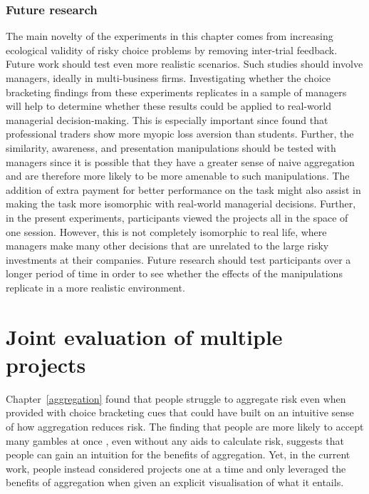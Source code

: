 \documentclass[a4paper, nobind, dvipsnames]{templates/ociamthesis}
\theoremstyle{definition}
\theoremstyle{definition}
\theoremstyle{definition}
\theoremstyle{definition}
\theoremstyle{remark}
\begin{document}
\subsection{Future research}

The main novelty of the experiments in this chapter comes from increasing
ecological validity of risky choice problems by removing inter-trial feedback.
Future work should test even more realistic scenarios. Such studies should
involve managers, ideally in multi-business firms. Investigating whether the
choice bracketing findings from these experiments replicates in a sample of
managers will help to determine whether these results could be applied to
real-world managerial decision-making. This is especially important since
\textcite{haigh2005} found that professional traders show more myopic loss aversion than
students. Further, the similarity, awareness, and presentation manipulations
should be tested with managers since it is possible that they have a greater
sense of naive aggregation and are therefore more likely to be more amenable to
such manipulations. The addition of extra payment for better performance on the
task might also assist in making the task more isomorphic with real-world
managerial decisions. Further, in the present experiments, participants viewed
the projects all in the space of one session. However, this is not completely
isomorphic to real life, where managers make many other decisions that are
unrelated to the large risky investments at their companies. Future research
should test participants over a longer period of time \autocite[as in][]{beshears2016} in
order to see whether the effects of the manipulations replicate in a more
realistic environment.

\newpage

\printbibliography[segment=\therefsegment,heading=subbibintoc]

\hypertarget{interstitial-1}{%
\chapter{Joint evaluation of multiple projects}\label{interstitial-1}}

Chapter~\ref{aggregation} found that people struggle to aggregate risk even
when provided with choice bracketing cues that could have built on an intuitive
sense of how aggregation reduces risk. The finding that people are more likely
to accept many gambles at once \autocites[e.g.,][]{samuelson1963,wedell1994}, even without
any aids to calculate risk, suggests that people can gain an intuition for the
benefits of aggregation. Yet, in the current work, people instead considered
projects one at a time and only leveraged the benefits of aggregation when given
an explicit visualisation of what it entails.
\end{document}
